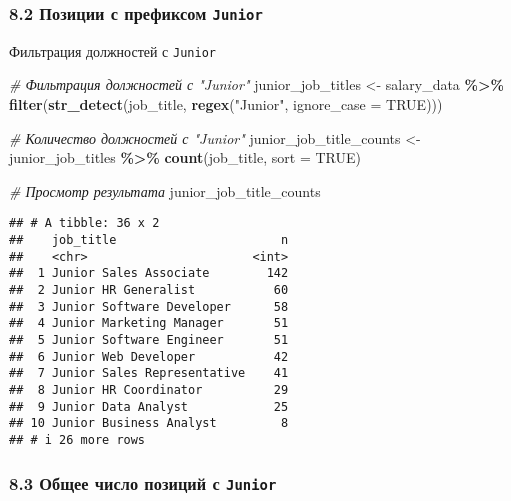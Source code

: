 \documentclass[
]{article}
\newenvironment{Shaded}{\begin{snugshade}}{\end{snugshade}}
\newcommand{\AttributeTok}[1]{\textcolor[rgb]{0.13,0.29,0.53}{#1}}
\newcommand{\CommentTok}[1]{\textcolor[rgb]{0.56,0.35,0.01}{\textit{#1}}}
\newcommand{\ConstantTok}[1]{\textcolor[rgb]{0.56,0.35,0.01}{#1}}
\newcommand{\FunctionTok}[1]{\textcolor[rgb]{0.13,0.29,0.53}{\textbf{#1}}}
\newcommand{\NormalTok}[1]{#1}
\newcommand{\OtherTok}[1]{\textcolor[rgb]{0.56,0.35,0.01}{#1}}
\newcommand{\SpecialCharTok}[1]{\textcolor[rgb]{0.81,0.36,0.00}{\textbf{#1}}}
\newcommand{\StringTok}[1]{\textcolor[rgb]{0.31,0.60,0.02}{#1}}
\begin{document}
\subsubsection{\texorpdfstring{8.2 Позиции с префиксом
\texttt{Junior}}{8.2 Позиции с префиксом Junior}}\label{ux43fux43eux437ux438ux446ux438ux438-ux441-ux43fux440ux435ux444ux438ux43aux441ux43eux43c-junior}

Фильтрация должностей с \texttt{Junior}

\begin{Shaded}
\begin{Highlighting}[]
\CommentTok{\# Фильтрация должностей с "Junior"}
\NormalTok{junior\_job\_titles }\OtherTok{\textless{}{-}}\NormalTok{ salary\_data }\SpecialCharTok{\%\textgreater{}\%}
  \FunctionTok{filter}\NormalTok{(}\FunctionTok{str\_detect}\NormalTok{(job\_title, }\FunctionTok{regex}\NormalTok{(}\StringTok{"Junior"}\NormalTok{, }\AttributeTok{ignore\_case =} \ConstantTok{TRUE}\NormalTok{)))}

\CommentTok{\# Количество должностей с "Junior"}
\NormalTok{junior\_job\_title\_counts }\OtherTok{\textless{}{-}}\NormalTok{ junior\_job\_titles }\SpecialCharTok{\%\textgreater{}\%}
  \FunctionTok{count}\NormalTok{(job\_title, }\AttributeTok{sort =} \ConstantTok{TRUE}\NormalTok{)}

\CommentTok{\# Просмотр результата}
\NormalTok{junior\_job\_title\_counts}
\end{Highlighting}
\end{Shaded}

\begin{verbatim}
## # A tibble: 36 x 2
##    job_title                       n
##    <chr>                       <int>
##  1 Junior Sales Associate        142
##  2 Junior HR Generalist           60
##  3 Junior Software Developer      58
##  4 Junior Marketing Manager       51
##  5 Junior Software Engineer       51
##  6 Junior Web Developer           42
##  7 Junior Sales Representative    41
##  8 Junior HR Coordinator          29
##  9 Junior Data Analyst            25
## 10 Junior Business Analyst         8
## # i 26 more rows
\end{verbatim}

\subsubsection{\texorpdfstring{8.3 Общее число позиций с
\texttt{Junior}}{8.3 Общее число позиций с Junior}}\label{ux43eux431ux449ux435ux435-ux447ux438ux441ux43bux43e-ux43fux43eux437ux438ux446ux438ux439-ux441-junior}
\end{document}
